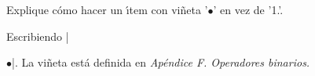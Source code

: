 


\bigskip

\enunciadoS Explique c\'omo hacer un \'{\i}tem con vi\~neta
'$\bullet$' en vez de '1.'.

\bigskip

\respuestaS Escribiendo |\item{$\bullet$}|. La vi\~neta est\'a
definida en {\sl Ap\'endice F. Operadores binarios.}

\bye

